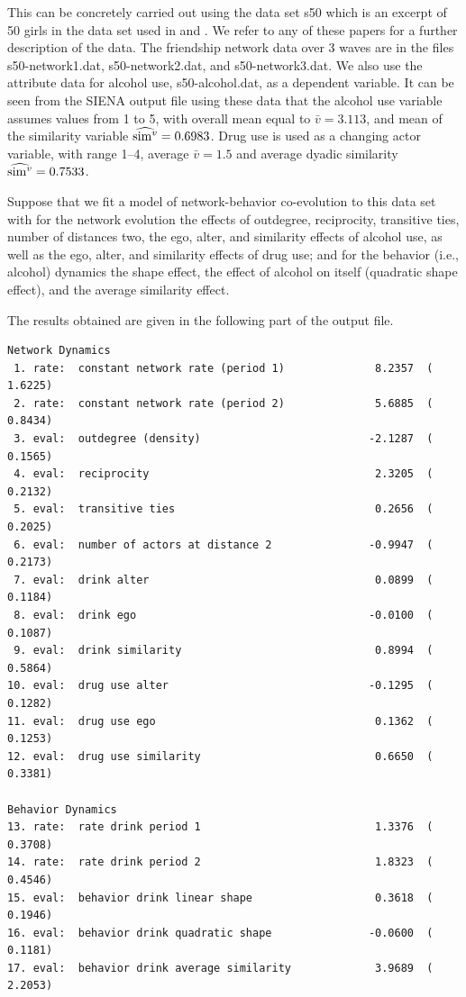 \documentclass[a4paper,fleqn,11pt]{article}
\newcommand{\+}{\, + \,}
\newcommand{\SI}{{\sf SIENA }}
\begin{document}
This can be concretely carried out using the data set {\sf s50}
which is an excerpt of 50 girls in the data set used in
\citet{PearsonMichell00, PearsonWest03,
SteglichEA06} and \citet{SteglichEA10}.
We refer to any of these papers for a further description of the data.
The friendship network data over 3 waves are in
the files {\sf s50-network1.dat}, {\sf s50-network2.dat},
and {\sf s50-network3.dat}.
We also use the attribute data
for alcohol use, {\sf s50-alcohol.dat}, as a dependent variable.
It can be seen from the \SI output file using these data that
the alcohol use variable assumes values from 1 to 5, with overall mean
equal to $\bar v = 3.113$, and mean of the
similarity variable $\widehat{{\rm sim}^v} = 0.6983$.
Drug use is used as a changing actor variable, with
range 1--4, average $\bar v = 1.5$ and
average dyadic similarity $\widehat{{\rm sim}^v} = 0.7533$.

Suppose that we fit a model of network-behavior co-evolution to this data set
with for the network evolution the effects of outdegree, reciprocity,
transitive ties, number of distances two,
the ego, alter, and similarity effects of alcohol use,
as well as the ego, alter, and similarity effects of drug use;
and for the behavior (i.e., alcohol) dynamics
the shape effect,
the effect of alcohol on itself (quadratic shape effect),
and the average similarity effect.

The results obtained are given in the following
part of the output file.

{\footnotesize
\begin{verbatim}
Network Dynamics
 1. rate:  constant network rate (period 1)              8.2357  (   1.6225)
 2. rate:  constant network rate (period 2)              5.6885  (   0.8434)
 3. eval:  outdegree (density)                          -2.1287  (   0.1565)
 4. eval:  reciprocity                                   2.3205  (   0.2132)
 5. eval:  transitive ties                               0.2656  (   0.2025)
 6. eval:  number of actors at distance 2               -0.9947  (   0.2173)
 7. eval:  drink alter                                   0.0899  (   0.1184)
 8. eval:  drink ego                                    -0.0100  (   0.1087)
 9. eval:  drink similarity                              0.8994  (   0.5864)
10. eval:  drug use alter                               -0.1295  (   0.1282)
11. eval:  drug use ego                                  0.1362  (   0.1253)
12. eval:  drug use similarity                           0.6650  (   0.3381)

Behavior Dynamics
13. rate:  rate drink period 1                           1.3376  (   0.3708)
14. rate:  rate drink period 2                           1.8323  (   0.4546)
15. eval:  behavior drink linear shape                   0.3618  (   0.1946)
16. eval:  behavior drink quadratic shape               -0.0600  (   0.1181)
17. eval:  behavior drink average similarity             3.9689  (   2.2053)
\end{verbatim}
}
\end{document}
